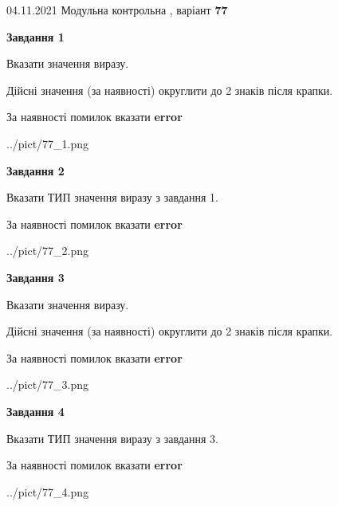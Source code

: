 \documentclass[11pt, ukrainian]{article}
\begin{document}
{04.11.2021 Модульна контрольна , варіант  \No \textbf { 77 }\par}
{
\begin {large}
{\begin {center}\textbf{Завдання 1}\end {center}}\par
Вказати значення виразу. \par
Дійсні значення (за наявності) округлити до 2 знаків після крапки. \par
За наявності помилок вказати \textbf{error}

\begin{center}
	{../pict/77_1.png}
\end{center}
\newpage

{\begin {center}\textbf{Завдання 2}\end {center}}\par
Вказати ТИП значення виразу з завдання 1. \par
За наявності помилок вказати \textbf{error}

\begin{center}
	{../pict/77_2.png}
\end{center}
\newpage

{\begin {center}\textbf{Завдання 3}\end {center}}\par
Вказати значення виразу. \par
Дійсні значення (за наявності) округлити до 2 знаків після крапки. \par
За наявності помилок вказати \textbf{error}

\begin{center}
	{../pict/77_3.png}
\end{center}
\newpage

{\begin {center}\textbf{Завдання 4}\end {center}}\par
Вказати ТИП значення виразу з завдання 3. \par
За наявності помилок вказати \textbf{error}

\begin{center}
	{../pict/77_4.png}
\end{center}
\newpage


\end{large}}
\end{document}
